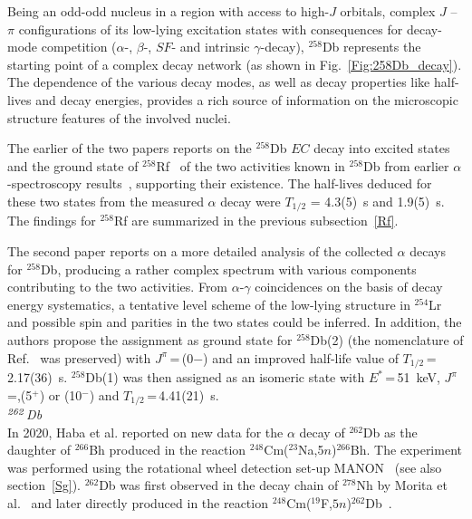 Being an odd-odd nucleus in a region with access to high-$J$ orbitals, complex $J$ -- $\pi$ configurations of its low-lying excitation states with consequences for decay-mode competition ($\alpha$-, $\beta$-, $SF$- and intrinsic $\gamma$-decay), $^{258}$Db represents the starting point of a complex decay network (as shown in Fig.~\ref{Fig:258Db_decay}).
The dependence of the various decay modes, as well as decay properties like half-lives and decay energies, provides a rich source of information on the microscopic structure features of the involved nuclei.   

The earlier of the two papers reports on the $^{258}$Db $EC$ decay into excited states and the ground state of $^{258}$Rf~\cite{Hessberger2016a} of the two activities known in $^{258}$Db from earlier $\alpha$-spectroscopy results~\cite{Hessberger2009}, supporting their existence. 
The half-lives deduced for these two states from the measured $\alpha$ decay were $T_{1/2}$ = 4.3(5)~s and 1.9(5)~s. 
The findings for $^{258}$Rf are summarized in the previous subsection~\ref{Rf}. 

The second paper reports on a more detailed analysis of the collected $\alpha$ decays for $^{258}$Db, producing a rather complex spectrum with various components contributing to the two activities. 
From $\alpha$-$\gamma$ coincidences on the basis of decay energy systematics, a tentative level scheme of the low-lying structure in $^{254}$Lr and possible spin and parities in the two states could be inferred. 
In addition, the authors propose the assignment as ground state for $^{258}$Db(2) (the nomenclature of Ref.~\cite{Hessberger2009} was preserved) with $J^\pi$\,=\,(0$-$) and an improved half-life value of $T_{1/2}$\,=\,2.17(36)~s. $^{258}$Db(1) was then assigned as an isomeric state with $E^*$\,=\,51~keV, $J^\pi$\,=,(5$^+$) or (10$^-$) and $T_{1/2}$\,=\,4.41(21)~s.\\

{\it $^{\it262}$Db}\\
In 2020, Haba et al. reported on new data for the $\alpha$ decay of $^{262}$Db as the daughter of $^{266}$Bh produced in the reaction $^{248}$Cm($^{23}$Na,5$n$)$^{266}$Bh. The experiment was performed using the rotational wheel detection set-up MANON~\cite{Haba2020} (see also section~\ref{Sg}). $^{262}$Db was first observed in the decay chain of $^{278}$Nh by Morita et al.~\cite{Morita2004b,Morita2007a,Morita2009,Morita2012} and later directly produced in the reaction $^{248}$Cm($^{19}$F,$5n$)$^{262}$Db~\cite{Haba2014}.\\

